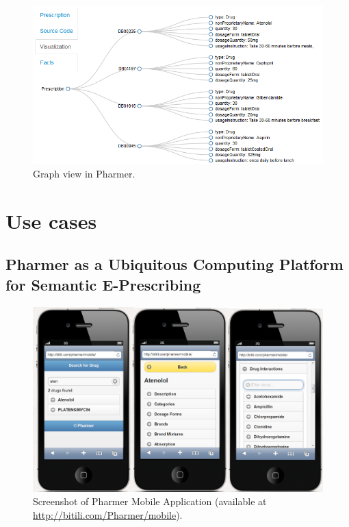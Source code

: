 \documentclass[journal]{IEEEtran}
\begin{document}
\begin{figure}[tb]
	\centering
		\includegraphics[width=1\columnwidth]{images/sc2.png}
	\caption{Graph view in Pharmer.}
	\label{fig:graphview}
\end{figure}

\section{Use cases}
\label{sec:usecases}

\subsection{Pharmer as a Ubiquitous Computing Platform for Semantic E-Prescribing}
\label{sec:mobile}

\begin{figure}[tb]
 \centering
 \includegraphics[width=1.5\columnwidth]{images/sc_Pharmer.png}
	\caption{Screenshot of Pharmer Mobile Application (available at \url{http://bitili.com/Pharmer/mobile}).}
 \label{fig:mobile}
\end{figure}
\end{document}
